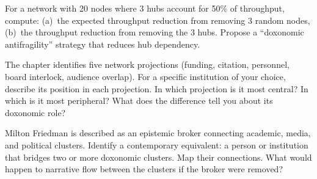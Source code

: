 \begin{exercise}
\label{ex:ch15-resilience}
For a network with 20 nodes where 3 hubs account for 50\% of throughput, compute:
(a)~the expected throughput reduction from removing 3 random nodes,
(b)~the throughput reduction from removing the 3 hubs.
Propose a ``doxonomic antifragility'' strategy that reduces hub dependency.
\end{exercise}

\begin{exercise}
The chapter identifies five network projections (funding, citation, personnel, board interlock, audience overlap).
For a specific institution of your choice, describe its position in each projection.
In which projection is it most central?
In which is it most peripheral?
What does the difference tell you about its doxonomic role?
\end{exercise}

\begin{exercise}
Milton Friedman is described as an epistemic broker connecting academic, media, and political clusters.
Identify a contemporary equivalent: a person or institution that bridges two or more doxonomic clusters.
Map their connections.
What would happen to narrative flow between the clusters if the broker were removed?
\end{exercise}
